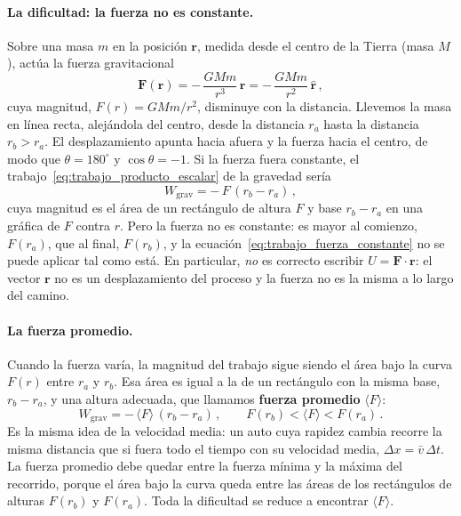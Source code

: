 \paragraph{La dificultad: la fuerza no es constante.}
Sobre una masa $m$ en la posición $\boldsymbol{r}$, medida desde el centro de
la Tierra (masa $M$), actúa la fuerza gravitacional
\begin{equation}
  \boldsymbol{F}(\boldsymbol{r})
  = -\,\frac{GMm}{r^{3}}\,\boldsymbol{r}
  = -\,\frac{GMm}{r^{2}}\,\hat{\boldsymbol{r}} \,,
  \label{eq:fuerza_grav_epot}
\end{equation}
cuya magnitud, $F(r) = GMm/r^{2}$, disminuye con la distancia. Llevemos la
masa en línea recta, alejándola del centro, desde la distancia $r_{a}$ hasta
la distancia $r_{b} > r_{a}$. El desplazamiento apunta hacia afuera y la
fuerza hacia el centro, de modo que $\theta = 180^{\circ}$ y
$\cos\theta = -1$. Si la fuerza fuera constante, el
trabajo~\eqref{eq:trabajo_producto_escalar} de la gravedad sería
\begin{equation}
  W_{\text{grav}} = -\,F\,(r_{b} - r_{a}) \,,
  \label{eq:trabajo_fuerza_constante}
\end{equation}
cuya magnitud es el área de un rectángulo de altura $F$ y base
$r_{b} - r_{a}$ en una gráfica de $F$ contra $r$. Pero la fuerza no es
constante: es mayor al comienzo, $F(r_{a})$, que al final, $F(r_{b})$, y la
ecuación~\eqref{eq:trabajo_fuerza_constante} no se puede aplicar tal como
está. En particular, \emph{no} es correcto escribir
$U = \boldsymbol{F}\cdot\boldsymbol{r}$: el vector $\boldsymbol{r}$ no es un
desplazamiento del proceso y la fuerza no es la misma a lo largo del camino.

\paragraph{La fuerza promedio.}
Cuando la fuerza varía, la magnitud del trabajo sigue siendo el área bajo la
curva $F(r)$ entre $r_{a}$ y $r_{b}$. Esa área es igual a la de un
rectángulo con la misma base, $r_{b} - r_{a}$, y una altura adecuada, que
llamamos \textbf{fuerza promedio} $\langle F\rangle$:
\begin{equation}
  W_{\text{grav}} = -\,\langle F\rangle\,(r_{b} - r_{a}) \,,
  \qquad
  F(r_{b}) < \langle F\rangle < F(r_{a}) \,.
  \label{eq:trabajo_fuerza_promedio}
\end{equation}
Es la misma idea de la velocidad media: un auto cuya rapidez cambia recorre la
misma distancia que si fuera todo el tiempo con su velocidad media,
$\Delta x = \bar{v}\,\Delta t$. La fuerza promedio debe quedar entre la
fuerza mínima y la máxima del recorrido, porque el área bajo la curva queda
entre las áreas de los rectángulos de alturas $F(r_{b})$ y $F(r_{a})$. Toda
la dificultad se reduce a encontrar $\langle F\rangle$.

